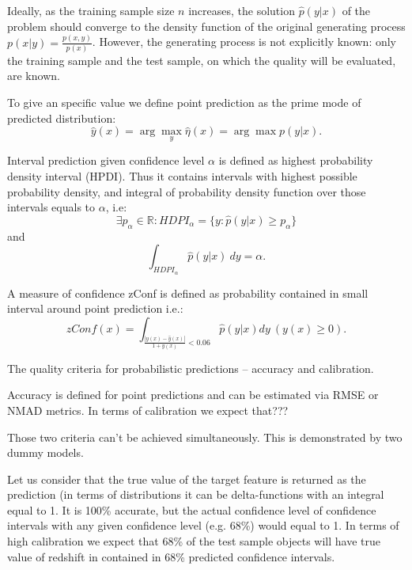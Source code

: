 \documentclass[fleqn,usenatbib]{mnras}
\begin{document}
Ideally, as the training sample size \(n\) increases, the solution \(\hat{p}(y|x)\) of the problem should converge to the density function of the original generating process \(p(x|y) = \frac{p(x,y)}{p(x)}\). However, the generating process is not explicitly known: only the training sample and the test sample, on which the quality will be evaluated, are known.

To give an specific value we define point prediction as the prime mode of predicted distribution:\begin{equation}\label{eq:point-estimate}
    \hat{y}(x) = \arg\max_y \hat{\eta}(x) = \arg\max p(y|x).
\end{equation}

Interval prediction given confidence level $\alpha$ is defined as highest probability density interval (HPDI). Thus it contains intervals with highest possible probability density, and integral of probability density function over those intervals equals to $\alpha$, i.e:
\begin{equation}\label{eq:hdpi_def}
    \exists p_\alpha \in \mathbb{R}: HDPI_{\alpha} = \{y : \hat{p}(y|x) \geq p_{\alpha}\}
\end{equation}
and
\begin{equation}
    \int_{HDPI_{\alpha}} \hat{p}(y|x) ~ dy = \alpha.
\end{equation}

A measure of confidence zConf is defined as probability contained in small interval around point prediction i.e.:\begin{equation}\label{eq:zconf}
    zConf(x) = \int_{\frac{|y(x) - \hat{y}(x)|}{1 + y(x)} < 0.06} \hat{p}(y|x)dy ~ (y(x) \geq 0).
\end{equation}

The quality criteria for probabilistic predictions -- accuracy and calibration.

Accuracy is defined for point predictions and can be estimated via RMSE or NMAD metrics. In terms of calibration we expect that???

Those two criteria can't be achieved simultaneously. This is demonstrated by two dummy models.

Let us consider that the true value of the target feature is returned as the prediction (in terms of distributions it can be delta-functions with an integral equal to 1. It is 100\% accurate, but the actual confidence level of confidence intervals with any given confidence level (e.g. 68\%) would equal to 1. In terms of high calibration we expect that 68\% of the test sample objects will have true value of redshift in contained in 68\% predicted confidence intervals.
\end{document}
